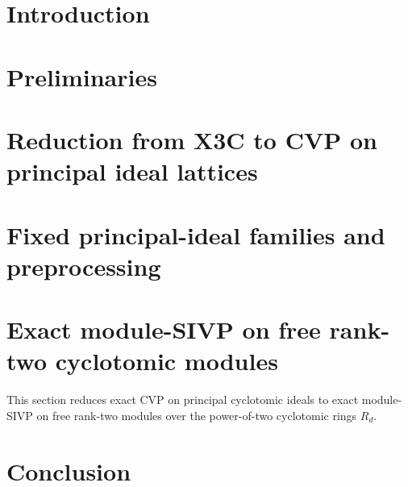\documentclass[11pt]{article}
\theoremstyle{definition}
\newcommand{\NP}{\mathsf{NP}}
\begin{document}
\begin{titlepage}
\begin{abstract}
{Finally, under the coefficient embedding, we prove that exact
decision-module-SIVP is \(\NP\)-complete on free rank-two modules over the
same cyclotomic rings.}
\fi
\end{abstract}

\end{titlepage}

\setcounter{page}{1}

\section{Introduction}
\label{sec:intro}


\section{Preliminaries}
\label{sec:pre}


\section{Reduction from X3C to CVP on principal ideal lattices}
\label{sec:compiler}


\section{Fixed principal-ideal families and preprocessing}
\label{sec:fixed}


\ifdefined\withModuleSIVP
\section{Exact module-SIVP on free rank-two cyclotomic modules}
\label{sec:module-sivp}
This section reduces exact CVP on principal cyclotomic ideals to
exact module-SIVP on free rank-two modules over the power-of-two cyclotomic
rings \(R_d\).


\fi

\section{Conclusion}
\label{sec:conclusion}
\end{document}
